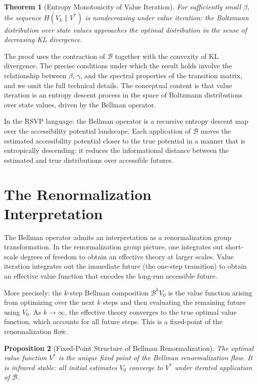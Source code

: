\documentclass[12pt, a4paper, openany]{book}
\theoremstyle{plain}
\newtheorem{theorem}{Theorem}[chapter]
\newtheorem{proposition}[theorem]{Proposition}
\theoremstyle{definition}
\theoremstyle{remark}
\newcommand{\BellmanOp}{\mathcal{B}}
\begin{document}
\begin{theorem}[Entropy Monotonicity of Value Iteration]
For sufficiently small $\beta$, the sequence $H(V_k \| V^*)$ is nondecreasing under value iteration: the Boltzmann distribution over state values approaches the optimal distribution in the sense of decreasing KL divergence.
\end{theorem}

The proof uses the contraction of $\BellmanOp$ together with the convexity of KL divergence. The precise conditions under which the result holds involve the relationship between $\beta$, $\gamma$, and the spectral properties of the transition matrix, and we omit the full technical details. The conceptual content is that value iteration is an entropy descent process in the space of Boltzmann distributions over state values, driven by the Bellman operator.

In the RSVP language: the Bellman operator is a recursive entropy descent map over the accessibility potential landscape. Each application of $\BellmanOp$ moves the estimated accessibility potential closer to the true potential in a manner that is entropically descending: it reduces the informational distance between the estimated and true distributions over accessible futures.

\section{The Renormalization Interpretation}

The Bellman operator admits an interpretation as a renormalization group transformation. In the renormalization group picture, one integrates out short-scale degrees of freedom to obtain an effective theory at larger scales. Value iteration integrates out the immediate future (the one-step transition) to obtain an effective value function that encodes the long-run accessible future.

More precisely: the $k$-step Bellman composition $\BellmanOp^k V_0$ is the value function arising from optimizing over the next $k$ steps and then evaluating the remaining future using $V_0$. As $k \to \infty$, the effective theory converges to the true optimal value function, which accounts for all future steps. This is a fixed-point of the renormalization flow.

\begin{proposition}[Fixed-Point Structure of Bellman Renormalization]
The optimal value function $V^*$ is the unique fixed point of the Bellman renormalization flow. It is infrared stable: all initial estimates $V_0$ converge to $V^*$ under iterated application of $\BellmanOp$.
\end{proposition}
\end{document}

